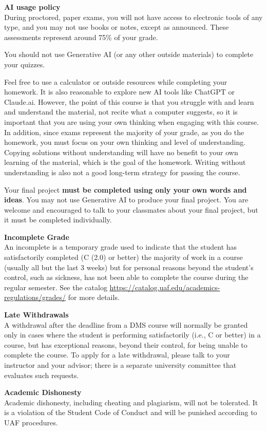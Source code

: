 \documentclass[11pt]{article}
\renewcommand{\emph}[1]{\textsf{\textbf{#1}}}
\newcommand{\localhead}[1]{\par\smallskip\textbf{#1} \smallskip\nobreak\\}%
\def\subheading#1{\localhead{\emph{#1}}}
\begin{document}
\subheading{AI usage policy} 
During proctored, paper exams, you will not have access to electronic tools of any type, and you may not use books or notes, except as announced.  These assessments represent around 75\% of your grade. 

You should not use Generative AI (or any other outside materials) to complete your quizzes.

Feel free to use a calculator or outside resources while completing your homework.  It is also reasonable to explore new AI tools like ChatGPT or Claude.ai. However, the point of this course is that you struggle with and learn and understand the material, not recite what a computer suggests, so it is important that you are using your own thinking when engaging with this course. In addition, since exams represent the  majority of your grade, as you do the homework, you must focus on your own thinking and level of understanding. Copying solutions without understanding will have no benefit to your own learning of the material, which is the goal of the homework.  Writing without understanding is also not a good long-term strategy for passing the course. 
  
Your final project \emph{must be completed using only your own words and ideas}. You may not use Generative AI to produce your final project. You are welcome and encouraged to talk to your classmates about your final project, but it must be completed individually.

\subheading{Incomplete Grade} 
An incomplete is a temporary grade used to indicate that the student has satisfactorily completed (C (2.0) or better) the majority of work in a course (usually all but the last 3 weeks) but for personal reasons beyond the student's control, such as sickness, has not been able to complete the course during the regular semester. See the catalog \url{https://catalog.uaf.edu/academics-regulations/grades/} for more details.

\subheading{Late Withdrawals} 
A withdrawal after the deadline from a DMS course will normally be granted only in cases where the student is performing satisfactorily (i.e., C or better) in a course, but has exceptional reasons, beyond their control, for being unable to complete the course. To apply for a late withdrawal, please talk to your instructor and your advisor; there is a separate university committee that evaluates such requests.

\subheading{Academic Dishonesty}
Academic dishonesty, including cheating and plagiarism, will not
be tolerated.  It is a violation of the Student Code of Conduct
and will be punished according to UAF procedures.
\end{document}
